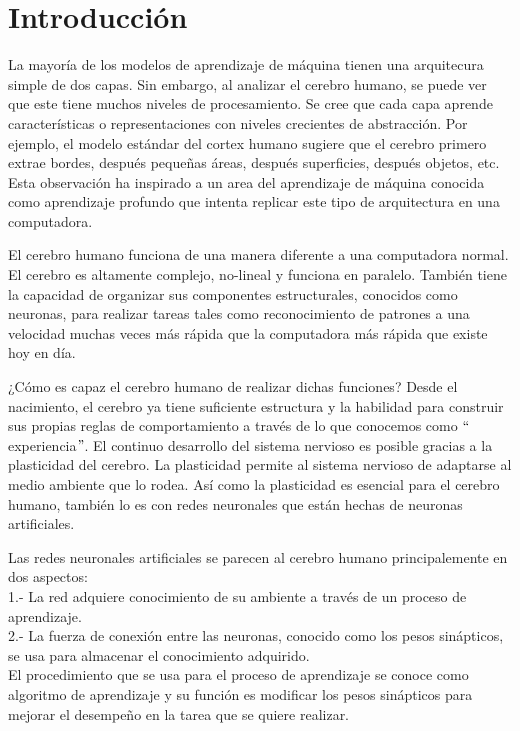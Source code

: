 \section{Introducción}
La mayoría de los modelos de aprendizaje de máquina tienen una arquitecura simple de dos capas. Sin embargo, al analizar el cerebro humano, se puede ver que este tiene muchos niveles de procesamiento. Se cree que cada capa aprende características o representaciones con niveles crecientes de abstracción. Por ejemplo, el modelo estándar del cortex humano sugiere que el cerebro primero extrae bordes, después pequeñas áreas, después superficies, después objetos, etc. Esta observación ha inspirado a un area del aprendizaje de máquina conocida como aprendizaje profundo que intenta replicar este tipo de arquitectura en una computadora.
\cite{Murphy:2012:MLP:2380985}

\vspace{1em}

El cerebro humano funciona de una manera diferente a una computadora normal. El cerebro es altamente complejo, no-lineal y funciona en paralelo. También tiene la capacidad de organizar sus componentes estructurales, conocidos como neuronas, para realizar tareas tales como reconocimiento de patrones a una velocidad muchas veces más rápida que la computadora más rápida que existe hoy en día.
\cite{Haykin:1998:NNC:521706}

\vspace{1em}

¿Cómo es capaz el cerebro humano de realizar dichas funciones? Desde el nacimiento, el cerebro ya tiene suficiente estructura y la habilidad para construir sus propias reglas de comportamiento a través de lo que conocemos como $``$experiencia$"$. El continuo desarrollo del sistema nervioso es posible gracias a la plasticidad del cerebro. La plasticidad permite al sistema nervioso de adaptarse al medio ambiente que lo rodea. Así como la plasticidad es esencial para el cerebro humano, también lo es con redes neuronales que están hechas de neuronas artificiales.
\cite{Haykin:1998:NNC:521706}

\vspace{1em}

Las redes neuronales artificiales se parecen al cerebro humano principalemente en dos aspectos: \\
1.- La red adquiere conocimiento de su ambiente a través de un proceso de aprendizaje.\\
2.- La fuerza de conexión entre las neuronas, conocido como los pesos sinápticos, se usa para almacenar el conocimiento adquirido. \\
El procedimiento que se usa para el proceso de aprendizaje se conoce como algoritmo de aprendizaje y su función es modificar los pesos sinápticos para mejorar el desempeño en la tarea que se quiere realizar. \cite{Haykin:1998:NNC:521706}


